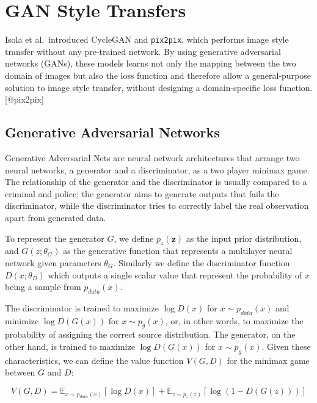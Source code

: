 \documentclass[12pt,a4paper,]{report}
\begin{document}
\hypertarget{gan-style-transfers}{%
\section{GAN Style Transfers}\label{gan-style-transfers}}

Isola et al.~introduced CycleGAN and \texttt{pix2pix}, which performs
image style transfer without any pre-trained network. By using
generative adversarial networks (GANs), these models learns not only the
mapping between the two domain of images but also the loss function and
therefore allow a general-purpose solution to image style transfer,
without designing a domain-specific loss function. {[}@pix2pix{]}

\hypertarget{generative-adversarial-networks}{%
\subsection{Generative Adversarial
Networks}\label{generative-adversarial-networks}}

Generative Adversarial Nets are neural network architectures that
arrange two neural networks, a generator and a discriminator, as a two
player minimax game. The relationship of the generator and the
discriminator is usually compared to a criminal and police; the
generator aims to generate outputs that fails the discriminator, while
the discriminator tries to correctly label the real observation apart
from generated data.

To represent the generator \(G\), we define \(p_z(\mathbf{z})\) as the
input prior distribution, and \(G(z; \theta_G)\) as the generative
function that represents a multilayer neural network given parameters
\(\theta_G\). Similarly we define the discriminator function
\(D(x; \theta_D)\) which outputs a single scalar value that represent
the probability of \(x\) being a sample from \(p_{data}(x)\).

The discriminator is trained to maximize \(\log D(x)\) for
\(x \sim p_{data}(x)\) and minimize \(\log D(G(x))\) for
\(x \sim p_g(x)\), or, in other words, to maximize the probability of
assigning the correct source distribution. The generator, on the other
hand, is trained to maximize \(\log D(G(x))\) for \(x \sim p_g(x)\).
Given these characteristics, we can define the value function
\(V(G, D)\) for the minimax game between \(G\) and \(D\):

\begin{equation}
    V(G, D) = \mathbb{E}_{x \sim p_{data}(x)}[\log D(x)] + \mathbb{E}_{z \sim p_{z}(z)}[\log (1 - D(G(z)))] \label{eq:gan}
\end{equation}
\end{document}
